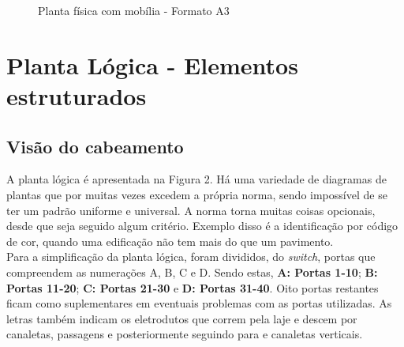 \documentclass[	DIV=calc,%
							paper=a4,%
							fontsize=12pt,%
							onecolumn]{scrartcl}	 					%
\begin{document}


\begin{figure}
	\noindent{}
	\caption{Planta física com mobília - Formato A3}
	\label{fig1}
\end{figure}

\clearpage
{}
\recalctypearea


\section{Planta Lógica - Elementos estruturados}

\subsection{Visão do cabeamento}
A planta lógica é apresentada na Figura 2. Há uma variedade de diagramas de plantas que por muitas vezes excedem a própria norma, sendo impossível de se ter um padrão uniforme e universal. A norma torna muitas coisas opcionais, desde que seja seguido algum critério. Exemplo disso é a identificação por código de cor, quando uma edificação não tem mais do que um pavimento.
\\

Para a simplificação da planta lógica, foram divididos, do \textit{switch}, portas que compreendem as numerações A, B, C e D. Sendo estas, \textbf{A: Portas 1-10}; \textbf{B: Portas 11-20}; \textbf{C: Portas 21-30} e \textbf{D: Portas 31-40}. Oito portas restantes ficam como suplementares em eventuais problemas com as portas utilizadas. As letras também indicam os eletrodutos que correm pela laje e descem por canaletas, passagens e posteriormente seguindo para e canaletas verticais. 
\\
\end{document}
